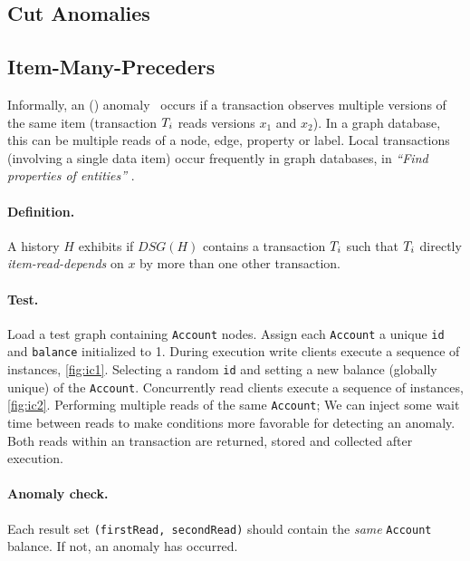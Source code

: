 \subsection{Cut Anomalies}

\subsection*{Item-Many-Preceders}
\label{sec:cut-anomalies}

Informally, an  () 
anomaly~\cite{DBLP:journals/pvldb/BailisDFGHS13} occurs if a transaction observes 
multiple versions of the same item (\eg transaction $T_i$ reads versions 
$x_1$ and $x_2$). In a graph database, this can be multiple reads of a node, edge, 
property or label. Local transactions (involving a single data item) occur 
frequently in graph databases, \eg in \emph{``Find properties of entities''} 
.

\paragraph{Definition.}
A history $H$ exhibits  if $\textit{DSG}(H)$ contains a transaction
$T_i$ such that $T_i$ directly \emph{item-read-depends} on $x$ by more
than one other transaction.

\paragraph{Test.}
Load a test graph containing \texttt{Account} nodes. Assign each \texttt{Account} 
a unique \texttt{id} and \texttt{balance} initialized to 1. During execution 
write clients execute a sequence of  instances, \autoref{fig:ic1}.
Selecting a random \texttt{id} and setting a new balance (globally unique) of the 
\texttt{Account}. Concurrently read clients execute a sequence of  
instances, \autoref{fig:ic2}. Performing multiple reads of the same \texttt{Account}; 
We can inject some wait time between reads to make conditions more favorable 
for detecting an anomaly. Both reads within an  
transaction are returned, stored and collected after execution.

\paragraph{Anomaly check.}
Each  result set \texttt{(firstRead, secondRead)} should
contain the \emph{same} \texttt{Account} balance. If not, an  
anomaly has occurred.

